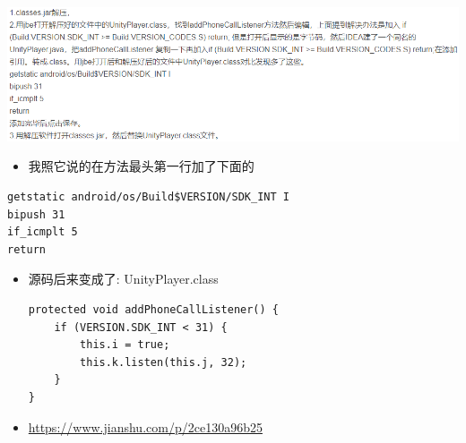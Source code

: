 \documentclass[9pt, b5paper]{article}
\begin{document}
\includegraphics[width=.9\linewidth]{./pic/notes_20221226_202949.png}
\begin{itemize}
\item 我照它说的在方法最头第一行加了下面的
\end{itemize}
\begin{verbatim}
getstatic android/os/Build$VERSION/SDK_INT I
bipush 31
if_icmplt 5
return
\end{verbatim}
\begin{itemize}
\item 源码后来变成了: UnityPlayer.class
\begin{verbatim}
protected void addPhoneCallListener() {
    if (VERSION.SDK_INT < 31) {
        this.i = true;
        this.k.listen(this.j, 32);
    }
}
\end{verbatim}
\item \url{https://www.jianshu.com/p/2ce130a96b25}
\end{itemize}
\end{document}
